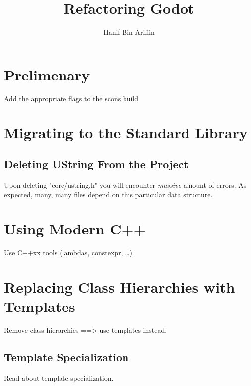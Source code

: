 \documentclass[a4paper,10pt]{book}
\title{Refactoring Godot}
\author{Hanif Bin Ariffin}
\begin{document}
\maketitle
\tableofcontents

\newpage
\section{Prelimenary}

Add the appropriate flags to the scons build

\newpage
\section{Migrating to the Standard Library}

\subsection{Deleting UString From the Project}

Upon deleting "core/ustring.h" you will encounter \textit{massive} amount of errors.
As expected, many, many files depend on this particular data structure.

\newpage
\section{Using Modern C++}

Use C++xx tools (lambdas, constexpr, \dots)

\newpage
\section{Replacing Class Hierarchies with Templates}

Remove class hierarchies ==> use templates instead.
\subsection{Template Specialization}

Read about template specialization.
\end{document}
